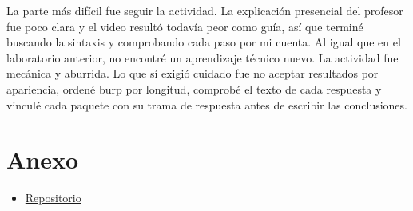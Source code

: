 \documentclass[letterpaper,12pt]{article}
\begin{document}
La parte más difícil fue seguir la actividad. La explicación presencial del profesor fue
poco clara y el video resultó todavía peor como guía, así que terminé buscando la sintaxis y
comprobando cada paso por mi cuenta. Al igual que en el laboratorio anterior, no encontré
un aprendizaje técnico nuevo. La actividad fue mecánica y aburrida. Lo que sí exigió
cuidado fue no aceptar resultados por apariencia, ordené burp por longitud, comprobé el
texto de cada respuesta y vinculé cada paquete con su trama de respuesta antes de escribir
las conclusiones.

\section*{Anexo}

\begin{itemize}
  \item \href{https://github.com/lavapatos/cripto-labs/tree/main/lab-2}{Repositorio}
\end{itemize}
\end{document}
